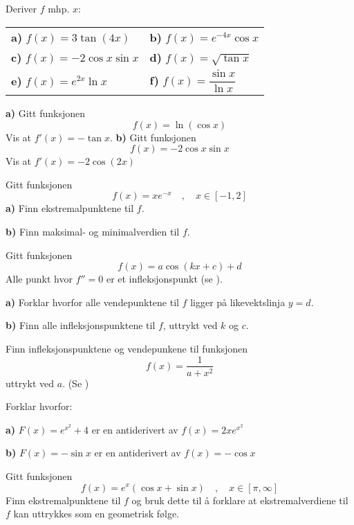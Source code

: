%




	
\eqlen	
\opgt
\setcounter{section}{1}	
Deriver $ f $ mhp. $ x $: \br

\begin{tabular}{@{}l l}	
	\textbf{a)} $ f(x)= 3\tan (4x)  $&\quad\textbf{b)} $f(x)=e^{-4x}\cos x$  \vspace{9 pt}\\
	\textbf{c)} $f(x)=-2 \cos x \sin x$
	&\quad \textbf{d)} $f(x)= \sqrt{\tan x}$ \vspace{9 pt}\\
	\textbf{e)} $f(x)= e^{2x} \ln x $ &\quad\textbf{f)} $f(x)= \dfrac{\sin x}{\ln x} $ 
\end{tabular}

\textbf{a)} Gitt funksjonen
\[ f(x)=\ln(\cos x) \]
Vis at $ {f'(x)=-\tan x} $.\os
\textbf{b)} Gitt funksjonen
\[ f(x)=-2\cos x \sin x \]
Vis at $ {f'(x)=-2\cos(2x)} $

\nes
{}
Gitt funksjonen
\[  f(x)=xe^{-x} \quad,\quad x\in[-1, 2]\]
\textbf{a)} Finn ekstremalpunktene til $ f $.\os

\textbf{b)} Finn maksimal- og minimalverdien til $ f $.

Gitt funksjonen
\[ f(x)=a\cos(kx+c)+d  \]
Alle punkt hvor $ {f''=0} $ er et infleksjonspunkt (se ).\os

\textbf{a)} Forklar hvorfor alle vendepunktene til $ f $
ligger på likevektslinja ${ y= d }$. \os

\textbf{b)} Finn alle infleksjonspunktene til $ f $, uttrykt ved $ k $ og $ c $. \os


Finn infleksjonspunktene og vendepunkene til funksjonen
\[ f(x)=\frac{1}{a+x^2} \]
uttrykt ved $ a $. (Se )

\nes
\newpage
{}
Forklar hvorfor:\os

\textbf{a)} ${F(x)= e^{x^2}+4} $ er en antiderivert av ${f(x)= 2xe^{x^2}} $\os

\textbf{b)} ${F(x)= -\sin x} $ er en antiderivert av ${f(x)= -\cos x} $

\ekspop
Gitt funksjonen
\[ f(x)=e^x(\cos x+\sin x)\quad,\quad x\in\left[\pi, \infty\right]\]
Finn ekstremalpunktene til $ f $ og bruk dette til å forklare at ekstremalverdiene til $ f $ kan uttrykkes som en geometrisk følge.
